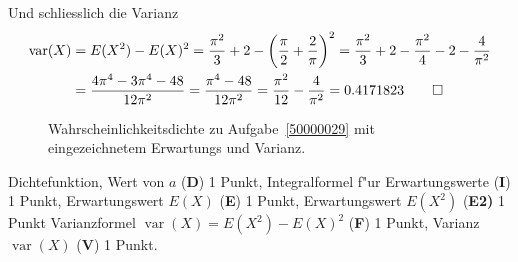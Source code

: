 \begin{loesung}
\begin{teilaufgaben}
Und schliesslich die Varianz
\begin{align*}
\operatorname{var}(X)
&=
E(X^2)-E(X)^2
=
\frac{\pi^2}3+2-\biggl(\frac{\pi}{2}+\frac{2}{\pi}\biggr)^2
=
\frac{\pi^2}3+2-\frac{\pi^2}{4}-2-\frac{4}{\pi^2}
\\
&=
\frac{4\pi^4-3\pi^4-48}{12\pi^2}
=
\frac{\pi^4-48}{12\pi^2}=\frac{\pi^2}{12}-\frac{4}{\pi^2}=0.4171823
\qedhere
\end{align*}
\end{teilaufgaben}
\begin{figure}
\centering
{}
\caption{Wahrscheinlichkeitsdichte zu Aufgabe~\ref{50000029} mit
eingezeichnetem Erwartungs und Varianz.
\label{50000029:phievar}}
\end{figure}
\end{loesung}


\begin{bewertung}
Dichtefunktion, Wert von $a$ ({\bf D}) 1 Punkt,
Integralformel f"ur Erwartungswerte ({\bf I}) 1 Punkt,
Erwartungswert $E(X)$ ({\bf E}) 1 Punkt,
Erwartungswert $E(X^2)$ ({\bf E2)} 1 Punkt
Varianzformel $\operatorname{var}(X)=E(X^2)-E(X)^2$ ({\bf F}) 1 Punkt,
Varianz $\operatorname{var}(X)$ ({\bf V}) 1 Punkt.
\end{bewertung}




